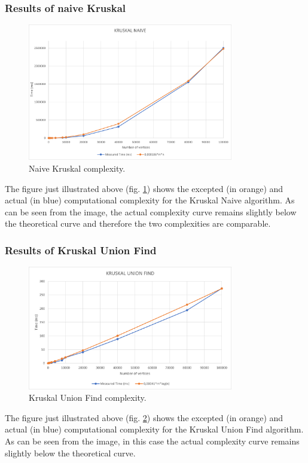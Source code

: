 \subsubsection{Results of naive Kruskal}
\begin{figure}[H]
    \centering
    \includegraphics[width=0.8\textwidth]{./img/KruskalNaive.png}
    \caption{Naive Kruskal complexity.}
    \label{fig:kruskal}
\end{figure}
The figure just illustrated above (fig. \ref{fig:kruskal}) shows the excepted (in orange) and actual 
(in blue) computational complexity for the Kruskal Naive algorithm. As can be seen from the image, 
the actual complexity curve remains slightly below the theoretical curve and therefore the two complexities are comparable.

\subsubsection{Results of Kruskal Union Find}
\begin{figure}[H]
    \centering
    \includegraphics[width=0.8\textwidth]{./img/KruskalUnionFind.png}
    \caption{Kruskal Union Find complexity.}
    \label{fig:kruskaluf}
\end{figure}
The figure just illustrated above (fig. \ref{fig:kruskaluf}) shows the excepted (in orange) and actual 
(in blue) computational complexity for the Kruskal Union Find algorithm. As can be seen from the image, in this case the actual 
complexity curve remains slightly below the theoretical curve.

